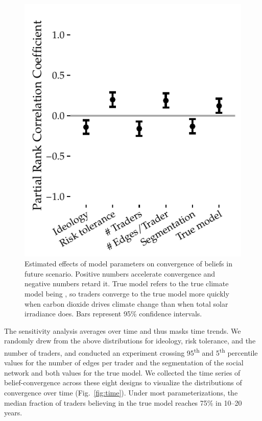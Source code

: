 \documentclass{article}\usepackage[]{graphicx}\usepackage[]{color}
\makeatletter
\def\maxwidth{ %
  \ifdim\Gin@nat@width>\linewidth
    \linewidth
  \else
    \Gin@nat@width
  \fi
}
\newenvironment{knitrout}{}{} %
\makeatother
\begin{document}
\begin{knitrout}
\color{fgcolor}\begin{figure}[t]

{\centering \includegraphics[width=\maxwidth]{sa-1} 

}

\caption[Estimated effects of model parameters on convergence of beliefs in future scenario]{Estimated effects of model parameters on convergence of beliefs in future scenario. Positive numbers accelerate convergence and negative numbers retard it. True model refers to the true climate model being , so traders converge to the true model more quickly when carbon dioxide drives climate change than when total solar irradiance does. Bars represent 95\% confidence intervals.}\label{fig:sa}
\end{figure}


\end{knitrout}

The sensitivity analysis averages over time and thus masks time trends. We randomly drew from the above distributions for ideology, risk tolerance, and the number of traders, and conducted an experiment crossing 95\textsuperscript{th} and 5\textsuperscript{th} percentile values for the number of edges per trader and the segmentation of the social network and both values for the true model. We collected the time series of belief-convergence across these eight designs to visualize the distributions of convergence over time (Fig.~\ref{fig:time}). Under most parameterizations, the median fraction of traders believing in the true model reaches 75\% in 10--20 years.
\end{document}
